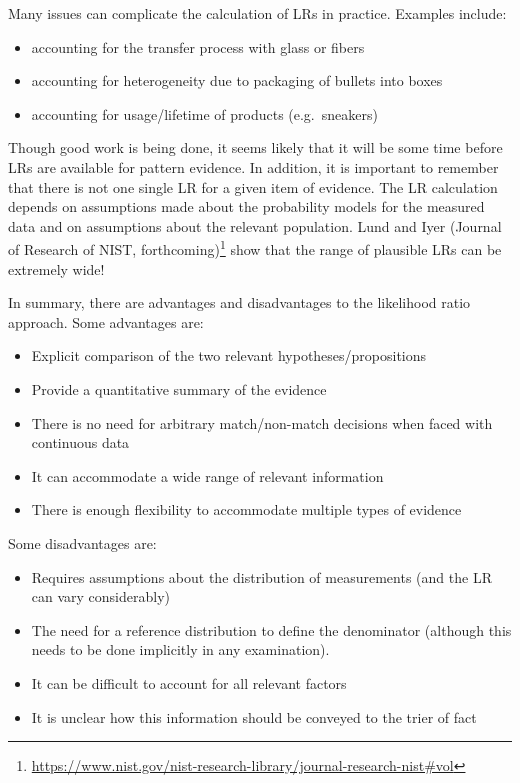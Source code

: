 \documentclass[]{book}
\providecommand{\tightlist}{%
  \setlength{\itemsep}{0pt}\setlength{\parskip}{0pt}}
\let\rmarkdownfootnote\footnote%
\def\footnote{\protect\rmarkdownfootnote}
\theoremstyle{definition}
\theoremstyle{definition}
\theoremstyle{remark}
\begin{document}
Many issues can complicate the calculation of LRs in practice. Examples
include:

\begin{itemize}
\tightlist
\item
  accounting for the transfer process with glass or fibers
\item
  accounting for heterogeneity due to packaging of bullets into boxes
\item
  accounting for usage/lifetime of products (e.g.~sneakers)
\end{itemize}

Though good work is being done, it seems likely that it will be some
time before LRs are available for pattern evidence. In addition, it is
important to remember that there is not one single LR for a given item
of evidence. The LR calculation depends on assumptions made about the
probability models for the measured data and on assumptions about the
relevant population. Lund and Iyer (Journal of Research of NIST,
forthcoming)\footnote{\url{https://www.nist.gov/nist-research-library/journal-research-nist\#vol}}
show that the range of plausible LRs can be extremely wide!

In summary, there are advantages and disadvantages to the likelihood
ratio approach. Some advantages are:

\begin{itemize}
\tightlist
\item
  Explicit comparison of the two relevant hypotheses/propositions
\item
  Provide a quantitative summary of the evidence
\item
  There is no need for arbitrary match/non-match decisions when faced
  with continuous data
\item
  It can accommodate a wide range of relevant information
\item
  There is enough flexibility to accommodate multiple types of evidence
\end{itemize}

Some disadvantages are:

\begin{itemize}
\tightlist
\item
  Requires assumptions about the distribution of measurements (and the
  LR can vary considerably)
\item
  The need for a reference distribution to define the denominator
  (although this needs to be done implicitly in any examination).
\item
  It can be difficult to account for all relevant factors
\item
  It is unclear how this information should be conveyed to the trier of
  fact
\end{itemize}
\end{document}

